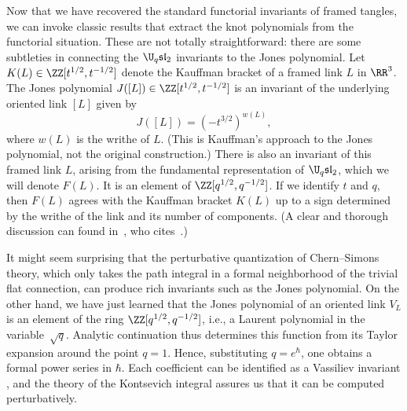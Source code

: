 \documentclass[10pt]{amsart}
\begin{document}
Now that we have recovered the standard functorial invariants of framed tangles,
we can invoke classic results that extract the knot polynomials from the functorial situation. 
These are not totally straightforward: 
there are some subtleties in connecting the $\U_q\mathfrak{sl}_2$ invariants to the Jones polynomial.
Let $K(L) \in \ZZ[t^{1/2},t^{-1/2}]$ denote the Kauffman bracket of a framed link $L$ in $\RR^3$.
The Jones polynomial $J([L]) \in \ZZ[t^{1/2},t^{-1/2}]$ is an invariant of the underlying oriented link $[L]$ given by
\[
J([L]) = (-t^{3/2})^{w(L)}, 
\]
where $w(L)$ is the writhe of $L$.
(This is Kauffman's approach to the Jones polynomial, not the original construction.)
There is also an invariant of this framed link $L$, arising from the fundamental representation of $\U_q\mathfrak{sl}_2$, 
which we will denote $F(L)$.
It is an element of $\ZZ[q^{1/2},q^{-1/2}]$.
If we identify $t$ and $q$,
then $F(L)$ agrees with the Kauffman bracket $K(L)$ up to a sign determined by the writhe of the link and its number of components.
(A clear and thorough discussion can found in~\cite{Tin},
who cites~\cite{Oht}.)

It might seem surprising that the perturbative quantization of Chern--Simons theory,
which only takes the path integral in a formal neighborhood of the trivial flat connection,
can produce rich invariants such as the Jones polynomial.
On the other hand, we have just learned that the Jones polynomial of an oriented link $V_L$ is an element of the ring $\ZZ[q^{1/2},q^{-1/2}]$, i.e., a Laurent polynomial in the variable~$\sqrt{q}$.
Analytic continuation thus determines this function from its Taylor expansion around the point $q=1$.
Hence, substituting $q = e^\hbar$, one obtains a formal power series in $\hbar$.
Each coefficient can be identified as a Vassiliev invariant \cite{KRT, KasTurChord}, 
and the theory of the Kontsevich integral assures us that it can be computed perturbatively.
\end{document}
